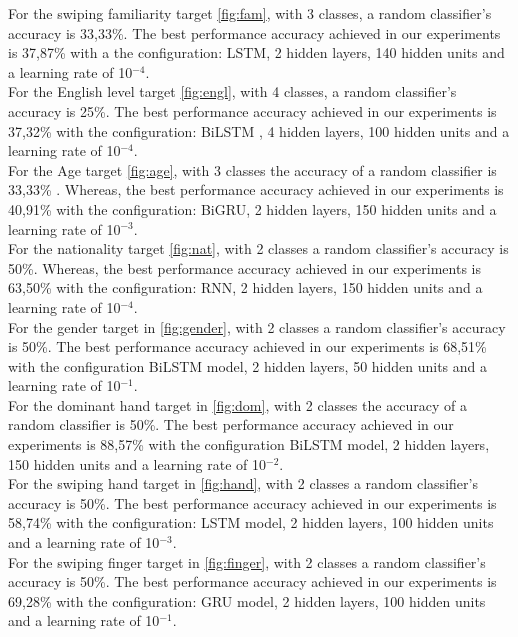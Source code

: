 \documentclass[11pt,oneside,a4paper,openright]{book}
\begin{document}
For the swiping familiarity target \autoref{fig:fam}, with 3 classes, a random classifier's accuracy is 33,33\%.  The best performance accuracy achieved in our experiments is 37,87\%  with a the configuration: LSTM, 2 hidden layers, 140 hidden units and a learning rate of 10$^{-4}$.\\

For the English level target \autoref{fig:engl}, with 4 classes, a random classifier's accuracy is 25\%. The best performance accuracy achieved in our experiments is 37,32\% with the configuration: BiLSTM , 4 hidden layers, 100 hidden units and a learning rate of 10$^{-4}$.\\

For the Age target \autoref{fig:age}, with 3 classes the accuracy of a random classifier is 33,33\% . Whereas,  the best performance accuracy achieved in our experiments is 40,91\% with the configuration: BiGRU, 2 hidden layers, 150 hidden units and a learning rate of 10$^{-3}$. \\

For the nationality target \autoref{fig:nat}, with 2 classes a random classifier's accuracy is 50\%. Whereas, the best performance accuracy achieved in our experiments is 63,50\% with the configuration: RNN, 2 hidden layers, 150 hidden units and a learning rate of 10$^{-4}$. \\

For the gender target in \autoref{fig:gender}, with 2 classes a random classifier's accuracy is 50\%. The best performance accuracy achieved in our experiments is 68,51\% with the configuration BiLSTM model, 2 hidden layers, 50 hidden units and a learning rate of 10$^{-1}$.\\

For the dominant hand target in \autoref{fig:dom}, with 2 classes the accuracy of a random classifier is 50\%. The best performance accuracy achieved in our experiments is 88,57\% with  the configuration BiLSTM model, 2 hidden layers, 150 hidden units and a learning rate of 10$^{-2}$.\\

For the swiping hand target in \autoref{fig:hand}, with 2 classes a random classifier's accuracy is 50\%. The best performance accuracy achieved in our experiments is 58,74\% with the configuration: LSTM model, 2 hidden layers, 100 hidden units and a learning rate of 10$^{-3}$.\\

For the swiping finger target in \autoref{fig:finger}, with 2 classes a random classifier's accuracy is 50\%. The best performance accuracy achieved in our experiments is 69,28\% with the configuration: GRU model, 2 hidden layers, 100 hidden units and a learning rate of 10$^{-1}$.\\
\end{document}
